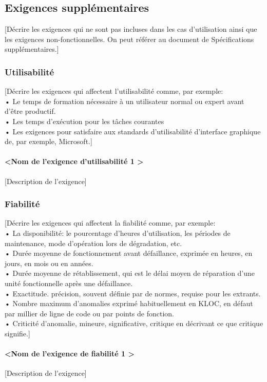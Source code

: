 \documentclass[10pt,a4paper]{report}
\begin{document}
\subsection{Exigences supplémentaires}
[Décrire les exigences qui ne sont pas incluses dans les cas d’utilisation ainsi que les exigences non-fonctionnelles. On peut référer au document de Spécifications supplémentaires.]

\subsubsection{Utilisabilité}
[Décrire les exigences qui affectent l’utilisabilité comme, par exemple:\\
•	Le temps de formation nécessaire à un utilisateur normal ou expert avant d’être productif.\\
•	Les temps d’exécution pour les tâches courantes\\
•	Les exigences pour satisfaire aux standards d’utilisabilité d’interface graphique de, par exemple, Microsoft.]
\paragraph{\textless Nom de l’exigence d’utilisabilité 1 \textgreater}
[Description de l’exigence]

\subsubsection{Fiabilité}
[Décrire les exigences qui affectent la fiabilité comme, par exemple:\\
•	La disponibilité: le pourcentage d’heures d’utilisation, les périodes de maintenance, mode d’opération lors de dégradation, etc.\\
•	Durée moyenne de fonctionnement avant défaillance, exprimée en heures, en jours, en mois ou en années.\\
•	Durée moyenne de rétablissement, qui est le délai moyen de réparation d'une unité fonctionnelle après une défaillance.\\
•	Exactitude. précision, souvent définie par de normes, requise pour les extrants.\\
•	Nombre maximum d’anomalies exprimé habituellement en KLOC, en défaut par millier de ligne de code ou par points de fonction.\\
•	Criticité d’anomalie, mineure, significative, critique en décrivant ce que critique signifie.]
\paragraph{\textless Nom de l’exigence de fiabilité 1 \textgreater}
[Description de l’exigence]
\end{document}
